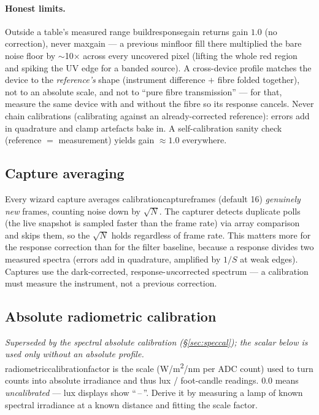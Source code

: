\documentclass[12pt,a4paper]{article}
\DeclareRobustCommand{\code}[1]{{\ttfamily\small\def\_{\rawus\allowbreak}#1}}
\DeclareRobustCommand{\key}[1]{{\ttfamily\small\color{acc2}\def\_{\rawus\allowbreak}#1}}
\begin{document}
\paragraph{Honest limits.} Outside a table's measured range
\code{build\_response\_gain} returns gain $1.0$ (no correction), never
\code{max\_gain} --- a previous \code{min\_floor} fill there multiplied the bare
noise floor by $\sim$10$\times$ across every uncovered pixel (lifting the whole red
region and spiking the UV edge for a banded source). A cross-device profile
matches the device to the \emph{reference's} shape (instrument difference $+$
fibre folded together), not to an absolute scale, and not to ``pure fibre
transmission'' --- for that, measure the same device with and without the fibre so
its response cancels. Never chain calibrations (calibrating against an
already-corrected reference): errors add in quadrature and clamp artefacts bake
in. A self-calibration sanity check (reference $=$ measurement) yields gain
$\approx 1.0$ everywhere.

\subsection{Capture averaging}\label{sec:cal-capture}
Every wizard capture averages \key{calibration\_capture\_frames} (default 16)
\emph{genuinely new} frames, counting noise down by $\sqrt{N}$. The capturer
detects duplicate polls (the live snapshot is sampled faster than the frame rate)
via array comparison and skips them, so the $\sqrt{N}$ holds regardless of frame
rate. This matters more for the response correction than for the filter baseline,
because a response divides two measured spectra (errors add in quadrature,
amplified by $1/S$ at weak edges). Captures use the dark-corrected,
response-\emph{un}corrected spectrum --- a calibration must measure the
instrument, not a previous correction.

\subsection{Absolute radiometric calibration}
\emph{Superseded by the spectral absolute calibration (\S\ref{sec:speccal}); the scalar below is used only without an absolute profile.}\\
\key{radiometric\_calibration\_factor} is the scale (W/m\textsuperscript{2}/nm per
ADC count) used to turn counts into absolute irradiance and thus lux / foot-candle
readings. $0.0$ means \emph{uncalibrated} --- lux displays show ``\,--\,''. Derive
it by measuring a lamp of known spectral irradiance at a known distance and fitting
the scale factor.
\end{document}

